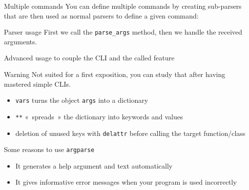 \begin{frame}{Multiple commands}
  You can define multiple commands by creating sub-parsers that are then used as normal parsers to define a given command:

\end{frame}

\begin{frame}{Parser usage}
  First we call the \texttt{parse\_args} method, then we handle the received arguments.

\end{frame}

\begin{frame}{Advanced usage to couple the CLI and the called feature}
  \begin{alertblock}{Warning}
    Not suited for a first exposition, you can study that after having mastered simple CLIs.
  \end{alertblock}

  \begin{itemize}
    \item \texttt{vars} turns the object \texttt{args} into a dictionary
    \item \texttt{**} «~spreads~» the dictionary into keywords and values
    \item deletion of unused keys with \texttt{delattr} before calling the target function/class
  \end{itemize}
\end{frame}

\begin{frame}{Some reasons to use \texttt{argparse}}
  \begin{itemize}
    \item It generates a help argument and text automatically
    \item It gives informative error messages when your program is used incorrectly 
  \end{itemize}
\end{frame}
